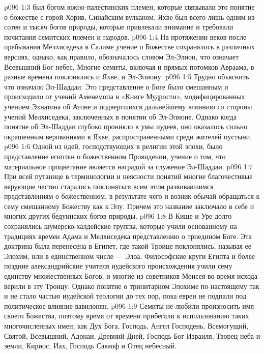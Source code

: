 \vs p096 1:3 \bibnobreakspace {} был богом южно\hyp{}палестинских племен, которые связывали это понятие о божестве с горой Хорив, Синайским вулканом. Яхве был всего лишь одним из сотен и тысяч богов природы, которые привлекали внимание и требовали почитания семитских племен и народов.
\vs p096 1:4 \bibnobreakspace {} На протяжении веков после пребывания Мелхиседека в Салиме  учение о Божестве сохранялось в различных версиях, однако, как правило, обозначалось словом Эл\hyp{}Элион, что означает Всевышний Бог небес. Многие семиты, включая и прямых потомков Авраама, в разные времена поклонялись и Яхве, и Эл\hyp{}Элиону.
\vs p096 1:5 \bibnobreakspace {} Трудно объяснить, что означало Эл\hyp{}Шаддаи. Это представление о Боге было смешанным и происходило от учений Аменемопа в «Книге Мудрости», модифицированных учением Эхнатона об Атоне и подвергшихся дальнейшему влиянию со стороны учений Мелхиседека, заключенных в понятии об Эл\hyp{}Элионе. Однако когда понятие об Эл\hyp{}Шаддаи глубоко проникло в умы иудеев, оно оказалось сильно окрашенным верованиями в Яхве, распространенными среди жителей пустыни.
\vs p096 1:6 Одной из идей, господствующих в религии этой эпохи, было представление египтян о божественном Провидении, учение о том, что материальное процветание является наградой за служение Эл\hyp{}Шаддаи.
\vs p096 1:7 \bibnobreakspace {} При всей путанице в терминологии и неясности понятий многие благочестивые верующие честно старались поклоняться всем этим развивавшимся представлениям о божественном, в результате чего и возник обычай обращаться к сему смешанному Божеству как к Элу. Причем это название заключало в себе и многих других бедуинских богов природы.
\vs p096 1:8 \bibnobreakspace {} В Кише и Уре долго сохранялись шумерско\hyp{}халдейские группы, которые учили основанному на традициях времен Адама и Мелхиседека представлению о триедином Боге. Эта доктрина была перенесена в Египет, где такой Троице поклонялись, называя ее Элохим, или в единственном числе --- Элоа. Философские круги Египта и более поздние александрийские учителя иудейского происхождения учили сему единству множественных Богов, и многие из советников Моисея во время исхода верили в эту Троицу. Однако понятие о тринитарном Элохиме по\hyp{}настоящему так и не стало частью иудейской теологии до тех пор, пока евреи не подпали под политическое влияние вавилонян.
\vs p096 1:9 \bibnobreakspace {} Семиты не любили произносить имя своего Божества, поэтому время от времени прибегали к использованию таких многочисленных имен, как Дух Бога, Господь, Ангел Господень, Всемогущий, Святой, Всевышний, Адонаи, Древний Дней, Господь Бог Израиля, Творец неба и земли, Кириос, Иах, Господь Саваоф и Отец небесный.
